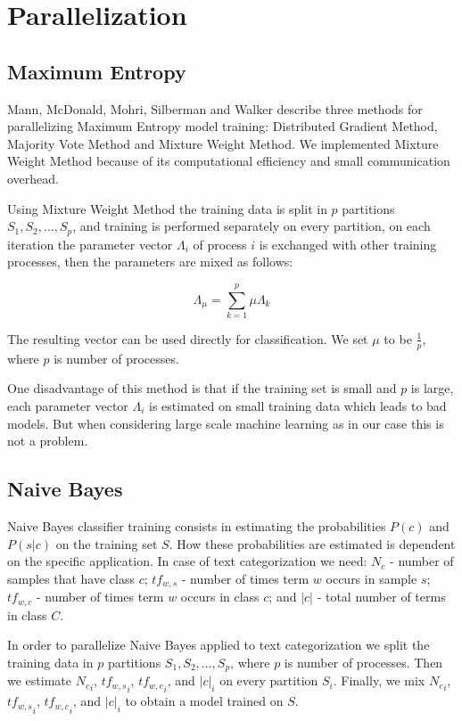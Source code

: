 \documentclass{report}
\begin{document}
\chapter{Parallelization}

\section{Maximum Entropy}

Mann, McDonald, Mohri, Silberman and Walker \cite{conf/nips/MannMMSW09} describe three methods for parallelizing Maximum Entropy model training: Distributed Gradient Method, Majority Vote Method and Mixture Weight Method. We implemented Mixture Weight Method because of its computational efficiency and small communication overhead.

Using Mixture Weight Method the training data is split in $p$ partitions $S_1, S_2, ..., S_p$, and training is performed separately on every partition, on each iteration the parameter vector $\Lambda_i$ of process $i$ is exchanged with other training processes, then the parameters are mixed as follows:

\[
\Lambda_{\mu} = \sum_{k=1}^{p} \mu \Lambda_{k}
\]

The resulting vector can be used directly for classification. We set $\mu$ to be $\frac{1}{p}$, where $p$ is number of processes. 

One disadvantage of this method is that if the training set is small and $p$ is large, each parameter vector $\Lambda_i$ is estimated on small training data which leads to bad models. But when considering large scale machine learning as in our case this is not a problem.

\section{Naive Bayes}

Naive Bayes classifier training consists in estimating the probabilities $P(c)$ and $P(s|c)$ on the training set $S$. How these probabilities are estimated  is dependent on the specific application. In case of text categorization we need: $N_c$ - number of samples that have class $c$; $tf_{w,s}$ - number of times term $w$ occurs in sample $s$; $tf_{w,c}$ - number of times term $w$ occurs in class $c$; and $|c|$ - total number of terms in class $C$.

In order to parallelize Naive Bayes applied to text categorization we split the training data in $p$ partitions $S_1, S_2, ..., S_p$, where $p$ is number of processes. Then we estimate ${N_c}_i$, ${tf_{w,s}}_i$, ${tf_{w,c}}_i$, and ${|c|}_i$ on every partition $S_i$. Finally, we mix ${N_c}_i$, ${tf_{w,s}}_i$, ${tf_{w,c}}_i$, and ${|c|}_i$ to obtain a model trained on $S$.
\end{document}
